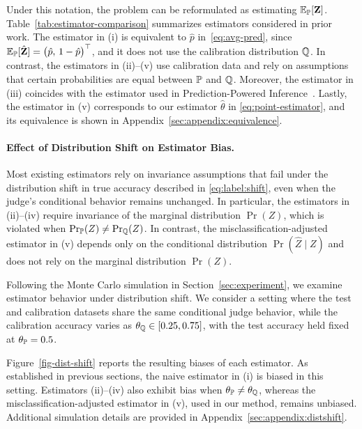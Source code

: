 Under this notation, the problem can be reformulated as estimating $\displaystyle \mathbb{E}_{{\mathbb{P}}}[{\mathbf{Z}}]$. Table~\ref{tab:estimator-comparison} summarizes estimators considered in prior work.
The estimator in (i) is equivalent to $\hat{p}$ in~\eqref{eq:avg-pred}, since $\displaystyle \mathbb{E}_{{\mathbb{P}}}[\hat{{\mathbf{Z}}}] = \big(\hat{p},\, 1-\hat{p}\big)^\top$, and it does not use the calibration distribution ${\mathbb{Q}}$.
In contrast, the estimators in (ii)–(v) use calibration data and rely on assumptions that certain probabilities are equal between ${\mathbb{P}}$ and ${\mathbb{Q}}$. Moreover, the estimator in (iii) coincides with the estimator used in Prediction-Powered Inference~\citep{angelopoulos2023prediction}.
Lastly, the estimator in (v) corresponds to our estimator $\hat{\theta}$ in \eqref{eq:point-estimator}, and its equivalence is shown in Appendix~\ref{sec:appendix:equivalence}.





\paragraph{Effect of Distribution Shift on Estimator Bias.}

Most existing estimators rely on invariance assumptions that fail under the distribution shift in true accuracy described in \eqref{eq:label:shift}, even when the judge’s conditional behavior remains unchanged. In particular, the estimators in (ii)–(iv) require invariance of the marginal distribution $\Pr(Z)$, which is violated when $\mathop{\rm Pr}\nolimits_{{\mathbb{P}}}(Z) \neq \mathop{\rm Pr}\nolimits_{{\mathbb{Q}}}(Z)$. In contrast, the misclassification-adjusted estimator in (v) depends only on the conditional distribution $\Pr(\hat Z \mid Z)$ and does not rely on the marginal distribution $\Pr(Z)$.

Following the Monte Carlo simulation in Section~\ref{sec:experiment}, we examine estimator behavior under distribution shift. We consider a setting where the test and calibration datasets share the same conditional judge behavior, while the calibration accuracy varies as $\theta_{{\mathbb{Q}}} \in [0.25, 0.75]$, with the test accuracy held fixed at $\theta_{{\mathbb{P}}} = 0.5$.


Figure~\ref{fig-dist-shift} reports the resulting biases of each estimator. As established in previous sections, the naive estimator in (i) is biased in this setting. Estimators (ii)–(iv) also exhibit bias when $\theta_{{\mathbb{P}}} \neq \theta_{{\mathbb{Q}}}$, whereas the misclassification-adjusted estimator in (v), used in our method, remains unbiased. Additional simulation details are provided in Appendix~\ref{sec:appendix:distshift}.



